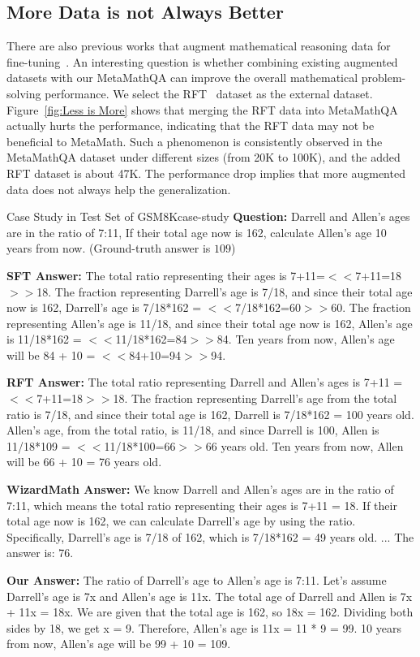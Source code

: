 \subsection{More Data is not Always Better}

There are also previous works that augment mathematical reasoning data for fine-tuning~\citep{luo2023wizardmath,yuan2023scaling}. An interesting question is whether combining existing augmented datasets with our {MetaMathQA} can improve the overall mathematical problem-solving performance. We select the RFT~\citep{yuan2023scaling} dataset as the external dataset. Figure~\ref{fig:Less is More} shows that merging the RFT data into {MetaMathQA} actually hurts the performance, indicating that the RFT data may not be beneficial to {MetaMath}. Such a phenomenon is consistently observed in the {MetaMathQA} dataset under different sizes (from 20K to 100K), and the added RFT dataset is about 47K. The performance drop implies that more augmented data does not always help the generalization.

\begin{exmp}{Case Study in Test Set of GSM8K}{case-study}\small
\textbf{Question:}
Darrell and Allen's ages are in the ratio of 7:11, If their total age now is 162, calculate Allen's age 10 years from now. {\color{red3}(Ground-truth answer is $109$)}

\textbf{SFT Answer:} The total ratio representing their ages is 7+11=$<<$7+11=18$>>$18. The fraction representing Darrell's age is 7/18, and since their total age now is 162, Darrell's age is 7/18*162 = $<<$7/18*162=60$>>$60. The fraction representing Allen's age is 11/18, and since their total age now is 162, Allen's age is 11/18*162 = $<<$11/18*162=84$>>$84. Ten years from now, Allen's age will be 84 + 10 = $<<$84+10=94$>>$94.

\textbf{RFT Answer:} The total ratio representing Darrell and Allen's ages is 7+11 = $<<$7+11=18$>>$18. The fraction representing Darrell's age from the total ratio is 7/18, and since their total age is 162, Darrell is 7/18*162 = 100 years old. Allen's age, from the total ratio, is 11/18, and since Darrell is 100, Allen is 11/18*109 = $<<$11/18*100=66$>>$66 years old. Ten years from now, Allen will be 66 + 10 = 76 years old.

\textbf{WizardMath Answer:} We know Darrell and Allen's ages are in the ratio of 7:11, which means the total ratio representing their ages is 7+11 = 18. If their total age now is 162, we can calculate Darrell's age by using the ratio. Specifically, Darrell's age is 7/18 of 162, which is 7/18*162 = 49 years old.  ...  The answer is: 76.

\textbf{Our Answer:} The ratio of Darrell's age to Allen's age is 7:11. Let's assume Darrell's age is 7x and Allen's age is 11x. The total age of Darrell and Allen is 7x + 11x = 18x. We are given that the total age is 162, so 18x = 162. Dividing both sides by 18, we get x = 9. Therefore, Allen's age is 11x = 11 * 9 = 99. 10 years from now, Allen's age will be 99 + 10 = 109.
\end{exmp}

